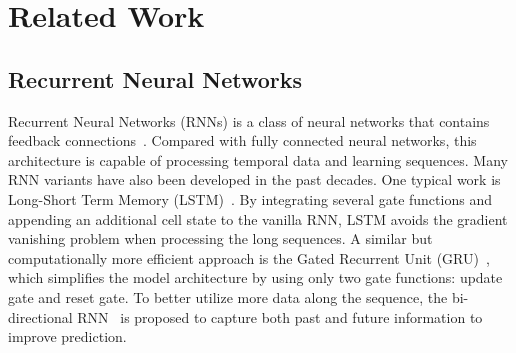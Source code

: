 \section{Related Work}
\label{sec:rel}

\subsection{Recurrent Neural Networks}
\label{sec:rnn}
Recurrent Neural Networks (RNNs) is a class of neural networks that contains feedback connections~\cite{hochreiter1991untersuchungen}.
Compared with fully connected neural networks, this architecture is capable of processing temporal data and learning sequences.
Many RNN variants have also been developed in the past decades.
One typical work is Long-Short Term Memory (LSTM)~\cite{hochreiter1997long}.
By integrating several gate functions and appending an additional cell state to the vanilla RNN, LSTM avoids the gradient vanishing problem when processing the long sequences.
A similar but computationally more efficient approach is the Gated Recurrent Unit (GRU)~\cite{cho2014learning}, which simplifies the model architecture by using only two gate functions: update gate and reset gate.
To better utilize more data along the sequence, the bi-directional RNN~\cite{schuster1997bidirectional} is proposed to capture both past and future information to improve prediction.

